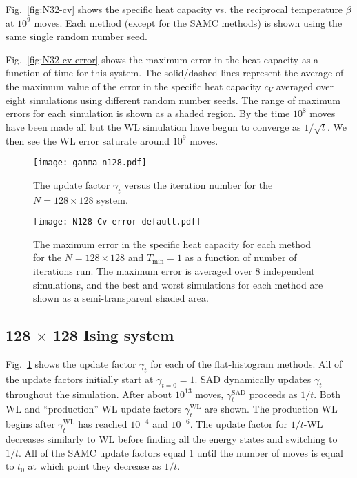 \documentclass[letterpaper,twocolumn,amsmath,amssymb,pre,aps,10pt]{revtex4-1}
\begin{document}
Fig.~\ref{fig:N32-cv} shows the specific heat capacity vs. the reciprocal temperature $\beta$ at $10^{9}$ moves. Each method (except for the SAMC methods) is shown using the same single random number seed.

Fig.~\ref{fig:N32-cv-error} shows the maximum error in the heat capacity as a function of time for
this system. The solid/dashed lines
represent the average of the maximum value of the error in the specific heat capacity $c_V$ averaged
over eight simulations using different random number seeds. The range of maximum
errors for each simulation is shown as a shaded region. By
the time $10^8$ moves have been made all but the WL simulation have begun to
converge as $1/\sqrt{t}$. We then see the WL error saturate around $10^9$ moves.

\begin{figure}
\texttt{[image: gamma-n128.pdf]}
  \caption{
  The update factor $\gamma_t$ versus the iteration number for the $N=128 \times 128$
  system.}
  \label{fig:N128-gamma}
\end{figure}

\begin{figure}
  \texttt{[image: N128-Cv-error-default.pdf]}
  \caption{The maximum error in the specific heat capacity for each method for the $N=128 \times 128$ and $T_{\min} = 1$ as a function of number of iterations run.  The maximum error is averaged over 8 independent simulations, and the best and worst simulations for each method are shown as a semi-transparent shaded area.}
  \label{fig:N128-cv-error}
\end{figure}


\subsection{128 $\times$ 128 Ising system}
Fig.~\ref{fig:N128-gamma} shows the update factor $\gamma_t$ for each of the flat-histogram methods. All of the update factors initially start at $\gamma_{t=0} = 1$. SAD dynamically updates $\gamma_t$ throughout the simulation. After about $10^{13}$ moves, $\gamma^{\text{SAD}}_t$ proceeds as $1/t$. Both WL and ``production'' WL update factors $\gamma^{\text{WL}}_t$ are shown. The production WL begins after $\gamma^{\text{WL}}_t$ has reached $10^{-4}$ and $10^{-6}$. The update factor for $1/t$-WL decreases similarly to WL before finding all the energy states and switching to $1/t$. All of the SAMC update factors equal 1 until the number of moves is equal to $t_0$ at which point they decrease as $1/t$.
\end{document}
